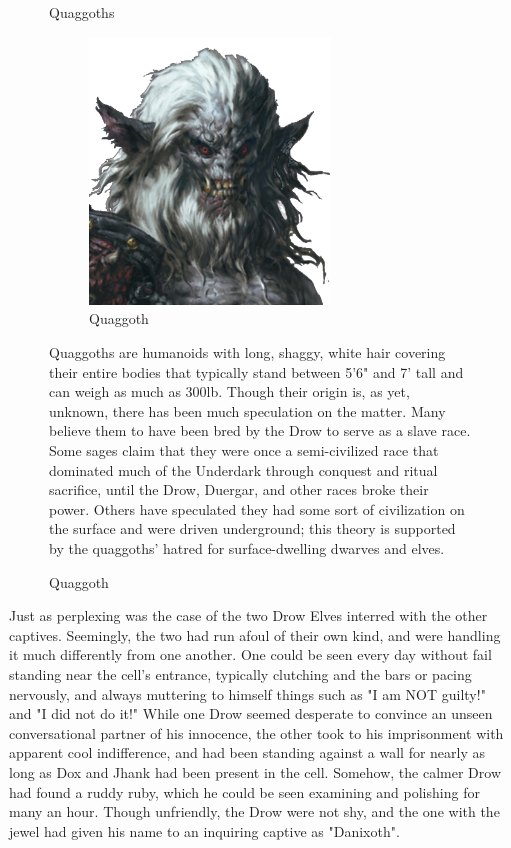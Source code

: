 \documentclass[letterpaper,10pt,twoside,twocolumn,openany]{book}
\begin{document}
\begin{figure}[h]
	\begin{paperbox}{Quaggoths}
		\begin{figure}[H]
			\centering
			\includegraphics[width=0.7\textwidth]{img/dist/quaggoth.png}
			\caption{Quaggoth\label{fig:quaggoth}}
		\end{figure}
		Quaggoths are humanoids with long, shaggy, white hair covering their entire bodies that typically stand between 5'6" and 7' tall and can weigh as much as 300lb. Though their origin is, as yet, unknown, there has been much speculation on the matter. Many believe them to have been bred by the Drow to serve as a slave race. Some sages claim that they were once a semi-civilized race that dominated much of the Underdark through conquest and ritual sacrifice, until the Drow, Duergar, and other races broke their power. Others have speculated they had some sort of civilization on the surface and were driven underground; this theory is supported by the quaggoths' hatred for surface-dwelling dwarves and elves.
	\end{paperbox}
\end{figure}

Just as perplexing was the case of the two Drow Elves interred with the other captives. Seemingly, the two had run afoul of their own kind, and were handling it much differently from one another. One could be seen every day without fail standing near the cell's entrance, typically clutching and the bars or pacing nervously, and always muttering to himself things such as "I am NOT guilty!" and "I did not do it!" While one Drow seemed desperate to convince an unseen conversational partner of his innocence, the other took to his imprisonment with apparent cool indifference, and had been standing against a wall for nearly as long as Dox and Jhank had been present in the cell. Somehow, the calmer Drow had found a ruddy ruby, which he could be seen examining and polishing for many an hour. Though unfriendly, the Drow were not shy, and the one with the jewel had given his name to an inquiring captive as "Danixoth".\\
\end{document}
